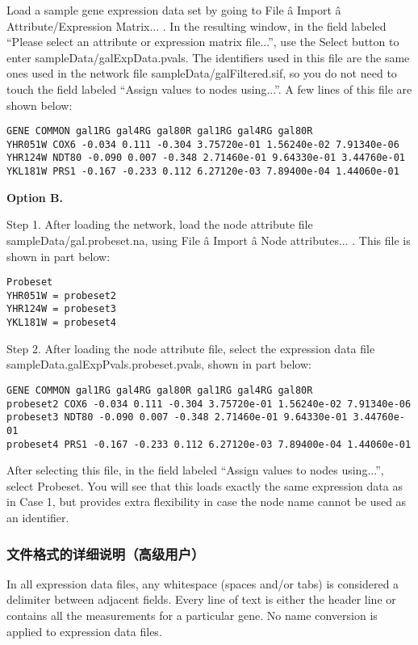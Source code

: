  Load a sample gene expression data set by going to File \^a Import \^a Attribute/Expression Matrix... . In the resulting window, in the field labeled ``Please select an attribute or expression matrix file...'', use the Select button to enter sampleData/galExpData.pvals. The identifiers used in this file are the same ones used in the network file sampleData/galFiltered.sif, so you do not need to touch the field labeled ``Assign values to nodes using...''. A few lines of this file are shown below: 

 \begin{verbatim}
GENE COMMON gal1RG gal4RG gal80R gal1RG gal4RG gal80R
YHR051W COX6 -0.034 0.111 -0.304 3.75720e-01 1.56240e-02 7.91340e-06
YHR124W NDT80 -0.090 0.007 -0.348 2.71460e-01 9.64330e-01 3.44760e-01
YKL181W PRS1 -0.167 -0.233 0.112 6.27120e-03 7.89400e-04 1.44060e-01
\end{verbatim}

 \textbf{Option B.}

 Step 1. After loading the network, load the node attribute file sampleData/gal.probeset.na, using File \^a Import \^a Node attributes... . This file is shown in part below: 

 \begin{verbatim}
Probeset
YHR051W = probeset2
YHR124W = probeset3
YKL181W = probeset4
\end{verbatim}

 Step 2. After loading the node attribute file, select the expression data file sampleData.galExpPvals.probeset.pvals, shown in part below: 

 \begin{verbatim}
GENE COMMON gal1RG gal4RG gal80R gal1RG gal4RG gal80R
probeset2 COX6 -0.034 0.111 -0.304 3.75720e-01 1.56240e-02 7.91340e-06
probeset3 NDT80 -0.090 0.007 -0.348 2.71460e-01 9.64330e-01 3.44760e-01
probeset4 PRS1 -0.167 -0.233 0.112 6.27120e-03 7.89400e-04 1.44060e-01
\end{verbatim}

 After selecting this file, in the field labeled ``Assign values to nodes using...'', select Probeset. You will see that this loads exactly the same expression data as in Case 1, but provides extra flexibility in case the node name cannot be used as an identifier. 
 
\subsubsection{文件格式的详细说明（高级用户）}
 In all expression data files, any whitespace (spaces and/or tabs) is considered a delimiter between adjacent fields. Every line of text is either the header line or contains all the measurements for a particular gene. No name conversion is applied to expression data files. 

